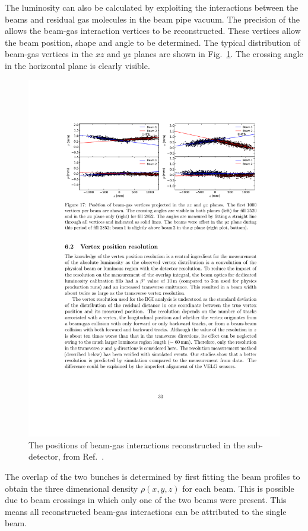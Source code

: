 The luminosity can also be calculated by exploiting the interactions between the beams and residual gas molecules in the beam pipe vacuum. The precision of the \velo allows the beam-gas interaction vertices to be reconstructed. These vertices allow the beam position, shape and angle to be determined. The typical distribution of beam-gas vertices in the $xz$ and $yz$ planes are shown in Fig.~\ref{fig:Dec_bgi_distro}. The crossing angle in the horizontal plane is clearly visible. 
\begin{figure}[!h]
    \centering
    \includegraphics[width=1.0\textwidth]{figs/Detector/lumi_bgi_distro.pdf}
    \caption{The positions of beam-gas interactions reconstructed in the \velo sub-detector, from Ref.~\cite{1748-0221-9-12-P12005}.}
    \label{fig:Dec_bgi_distro}   
\end{figure}
The overlap of the two bunches is determined by first fitting the beam profiles to obtain the three dimensional density $\rho(x,y,z)$ for each beam. This is possible due to beam crossings in which only one of the two beams were present. This means all reconstructed beam-gas interactions can be attributed to the single beam. 


